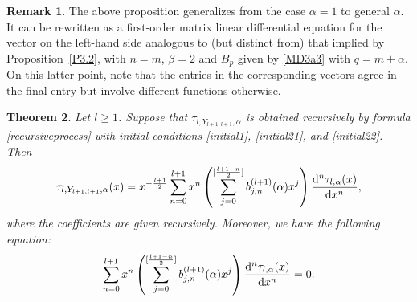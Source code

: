 \documentclass[pdftex]{sigma}
\numberwithin{equation}{section}
\newtheorem{Theorem}{Theorem}[section]
\theoremstyle{definition}
\newtheorem{Remark}[Theorem]{Remark}
\begin{document}
\begin{Remark}
The above proposition generalizes \cite[Proposition 4.3]{KW24b} from the case $\alpha=1$ to general $\alpha$.
It can be rewritten as a first-order matrix linear differential equation
for the vector on the left-hand side analogous to (but distinct from) that implied by Proposition~\ref{P3.2}, with $n=m$, $\beta =2$
and $B_p$ given by \eqref{MD3a3} with $q=m+\alpha$. On this latter point, note that the entries in the corresponding vectors agree in the final entry but involve different functions otherwise.
\end{Remark}

\begin{Theorem}\label{higherorderequationdorgeneralparameter}
Let $l \geq 1$. Suppose that $\tau_{l,Y_{l+1,l+1},\alpha}$ is obtained recursively by formula \eqref{recursiveprocess} with initial conditions \eqref{initial1}, \eqref{initial21}, and \eqref{initial22}. Then
\begin{gather}
\label{taukYss}
\tau_{l,Y_{l+1,l+1},\alpha}(x)
= x^{-\frac{l+1}{2}} \sum_{n=0}^{l+1} x^n
\left(\sum_{j=0}^{[\frac{l+1-n}{2}]} b_{j,n}^{(l+1)}(\alpha) x^j \right)
\frac{{\rm d}^n \tau_{l,\alpha}(x)}{{\rm d}x^n},
\end{gather}
where the coefficients  are given recursively. Moreover, we have the following equation:
\begin{gather}\label{generalhigherorderequation}
\sum_{n=0}^{l+1} x^n
\left(\sum_{j=0}^{[\frac{l+1-n}{2}]} b_{j,n}^{(l+1)}(\alpha) x^j \right)
\frac{{\rm d}^n \tau_{l,\alpha}(x)}{{\rm d}x^n} = 0.
\end{gather}
\end{Theorem}
\end{document}
